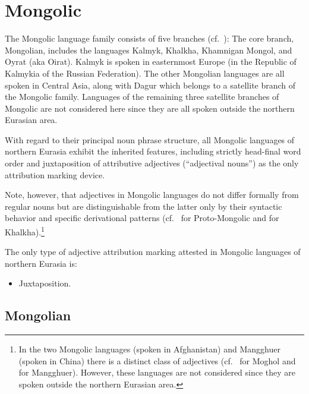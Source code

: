 \section{Mongolic}
The Mongolic language family consists of five branches (cf.~\citealt[222]{salminen2007}): The core branch, Mongolian, includes the languages Kalmyk, Khalkha, Khamnigan Mongol, and Oyrat (aka Oirat). Kalmyk is spoken in easternmost Europe (in the Republic of Kalmykia of the Russian Federation). The other Mongolian languages are all spoken in Central Asia, along with Dagur which belongs to a satellite branch of the Mongolic family. Languages of the remaining three satellite branches of Mongolic are not considered here since they are all spoken outside the northern Eurasian area.

With regard to their principal noun phrase structure, all Mongolic languages of northern Eurasia exhibit the inherited  features, including strictly head-final word order and juxtaposition of attributive adjectives (“adjectival nouns”) as the only attribution marking device.

Note, however, that adjectives in Mongolic languages do not differ formally from regular nouns but are distinguishable from the latter only by their syntactic behavior and specific derivational patterns (cf.~\citealt[10]{janhunen2003b} for Proto-Mongolic and \citealt[161]{svantesson2003} for Khalkha).\footnote{In the two Mongolic languages  (spoken in Afghanistan) and Mangghuer (spoken in China) there is a distinct class of adjectives (cf.~\citealt[252]{weiers2003} for Moghol and \citealt[311]{slater2003} for Mangghuer). However, these languages are not considered since they are spoken outside the northern Eurasian area.}

The only type of adjective attribution marking attested in Mongolic languages of northern Eurasia is:
\begin{itemize}
\item Juxtaposition.
\end{itemize}

\subsection{Mongolian}
